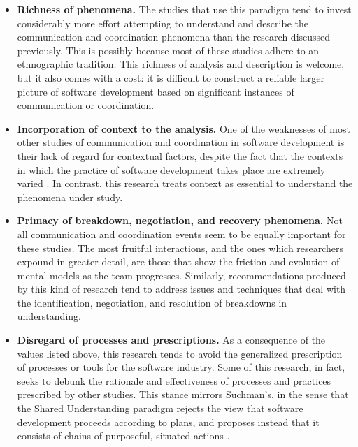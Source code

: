 \begin{itemize}
\item \textbf{Richness of phenomena.} The studies that use this paradigm tend to invest considerably more effort attempting to understand and describe the communication and coordination phenomena than the research discussed previously. This is possibly because most of these studies adhere to an ethnographic tradition. This richness of analysis and description is welcome, but it also comes with a cost: it is difficult to construct a reliable larger picture of software development based on significant instances of communication or coordination.

\item \textbf{Incorporation of context to the analysis.} One of the weaknesses of most other studies of communication and coordination in software development is their lack of regard for contextual factors, despite the fact that the contexts in which the practice of software development takes place are extremely varied \cite{Aranda2007}. In contrast, this research treats context as essential to understand the phenomena under study.

\item \textbf{Primacy of breakdown, negotiation, and recovery phenomena.} Not all communication and coordination events seem to be equally important for these studies. The most fruitful interactions, and the ones which researchers expound in greater detail, are those that show the friction and evolution of mental models as the team progresses. Similarly, recommendations produced by this kind of research tend to address issues and techniques that deal with the identification, negotiation, and resolution of breakdowns in understanding.

\item \textbf{Disregard of processes and prescriptions.} As a consequence of the values listed above, this research tends to avoid the generalized prescription of processes or tools for the software industry. Some of this research, in fact, seeks to debunk the rationale and effectiveness of processes and practices prescribed by other studies. This stance mirrors Suchman's, in the sense that the Shared Understanding paradigm rejects the view that software development proceeds according to plans, and proposes instead that it consists of chains of purposeful, situated actions \cite{Suchman1987}.

\end{itemize}

